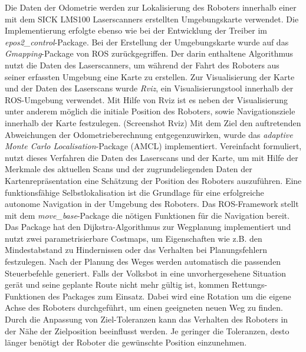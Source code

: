 Die Daten der Odometrie werden zur Lokalisierung des Roboters innerhalb einer mit dem SICK LMS100 Laserscanners erstellten Umgebungskarte verwendet. Die Implementierung erfolgte ebenso wie bei der Entwicklung der Treiber im \textit{epos2\_control}-Package. Bei der Erstellung der Umgebungskarte wurde auf das \textit{Gmapping}-Package von ROS zurückgegriffen. Der darin enthaltene Algorithmus nutzt die Daten des Laserscanners, um während der Fahrt des Roboters aus seiner erfassten Umgebung eine Karte zu erstellen. Zur Visualisierung der Karte und der Daten des Laserscans wurde \textit{Rviz}, ein Visualisierungstool innerhalb der ROS-Umgebung verwendet. Mit Hilfe von Rviz ist es neben der Visualisierung unter anderem möglich die initiale Position des Roboters, sowie Navigationsziele innerhalb der Karte festzulegen. (Screenshot Rviz) Mit dem Ziel den auftretenden Abweichungen der Odometrieberechnung entgegenzuwirken, wurde das \textit{adaptive Monte Carlo Localisation}-Package (AMCL) implementiert. Vereinfacht formuliert, nutzt dieses Verfahren die Daten des Laserscans und der Karte, um mit Hilfe der Merkmale des aktuellen Scans und der zugrundeliegenden Daten der Kartenrepräsentation eine Schätzung der Position des Roboters auszuführen. \cite[S. 6]{Bischoff:2004}
Eine funktionsfähige Selbstlokalisation ist die Grundlage für eine erfolgreiche autonome Navigation in der Umgebung des Roboters. Das ROS-Framework stellt mit dem \textit{move\_base}-Package die nötigen Funktionen für die Navigation bereit. Das Package hat den Dijkstra-Algorithmus zur Wegplanung implementiert und nutzt zwei parametrisierbare Costmaps, um Eigenschaften wie z.B. den Mindestabstand zu Hindernissen oder das Verhalten bei Planungsfehlern festzulegen. Nach der Planung des Weges werden automatisch die passenden Steuerbefehle generiert. Falls der Volksbot in eine unvorhergesehene Situation gerät und seine geplante Route nicht mehr gültig ist, kommen Rettungs-Funktionen des Packages zum Einsatz. Dabei wird eine Rotation um die eigene Achse des Roboters durchgeführt, um einen geeigneten neuen Weg zu finden. Durch die Anpassung von Ziel-Toleranzen kann das Verhalten des Roboters in der Nähe der Zielposition beeinflusst werden. Je geringer die Toleranzen, desto länger benötigt der Roboter die gewünschte Position einzunehmen.

